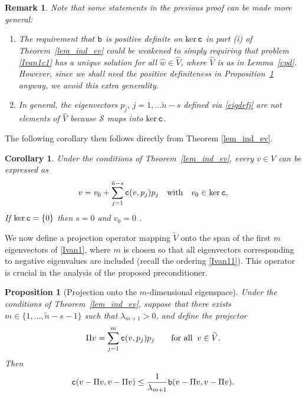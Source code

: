 \documentclass[numbers,webpdf,imaiai]{ima-authoring-template}%
\theoremstyle{thmstyletwo}%
\newtheorem{proposition}[theorem]{Proposition}%
\newtheorem{corollary}[theorem]{Corollary}
\newtheorem{remark}[theorem]{Remark}
\numberwithin{equation}{section}
\newcommand{\scS}{\mathcal{S}}
\newcommand{\txtb}{\textup{\texttt{b}}}
\newcommand{\txtc}{\textup{\texttt{c}}}
\newcommand{\wV}{\widetilde{V}}
\newcommand{\whV}{\widehat{V}}
\newcommand{\whw}{\widehat{w}}
\numberwithin{equation}{section}
\begin{document}
{\begin{remark}
Note that some statements in the previous proof can be made more general:
\begin{enumerate}
\item 
	The requirement that $\txtb$ is positive definite on $\ker \txtc$ in part \textup{(i)} of Theorem~\ref{lem_ind_ev} 
	could be weakened to simply requiring that problem \eqref{Ivan1c1} has a unique solution 
	for all {$\whw \in \whV$, where $\whV$ is as in Lemma~\ref{cpd}}. 
	However, since we shall need the positive definiteness in Proposition~\ref{lem_abs_proj} anyway, we avoid this extra generality.
\item
	In general, the eigenvectors $p_j,\, j = 1, \ldots \tilde n-s$ defined via \eqref{eigdefj} are not elements of $\whV$ 
	because $\scS$ maps into $\ker \txtc$.
\end{enumerate} 
\end{remark} 

\noindent
The following corollary then follows directly from Theorem \ref{lem_ind_ev}.

\begin{corollary}\label{lem_v_abstract2}
Under the conditions of Theorem~\ref{lem_ind_ev},  every $v \in V$ can be expressed as
\begin{equation}\label{Ivan5} 
	v =  v_0 +  \sum_{j=1}^{\tilde n-s} \txtc(v,p_j)p_j    \quad \text{with} \quad v_0 \in \ker \txtc,
\end{equation}
If $\ker\txtc = \{0\}$ then $s=0$ and $v_0 = 0$ .
\end{corollary}


We now define a projection operator mapping  ${\wV}$ onto the span of the first $m$
eigenvectors of \eqref{Ivan1}, where $m$ is chosen so that all eigenvectors corresponding to negative eigenvalues are included
(recall the ordering \eqref{Ivan11}).
This  operator is  crucial in the analysis of the proposed preconditioner.

\begin{proposition}[Projection onto the $m$-dimensional eigenspace]\label{lem_abs_proj}
Under the conditions of Theorem~\ref{lem_ind_ev}, 
suppose that there exists $m \in \{ 1, \ldots, \tilde n-s-1\}$
such that
$\lambda_{m+1}>0${,} 
and  define the projector
\begin{equation}\label{Ivan6}
	\Pi v = \sum_{j=1}^m \txtc(v,p_j) p_j \qquad \text{for all} \;\; v \in \wV.
\end{equation}
Then
\begin{equation}\label{Ivan7}
	\txtc(v-\Pi v,v-\Pi v) \le \frac{1}{\lambda_{m+1}} \txtb(v-\Pi v,v-\Pi v).
\end{equation}
\end{proposition}

}
\end{document}
